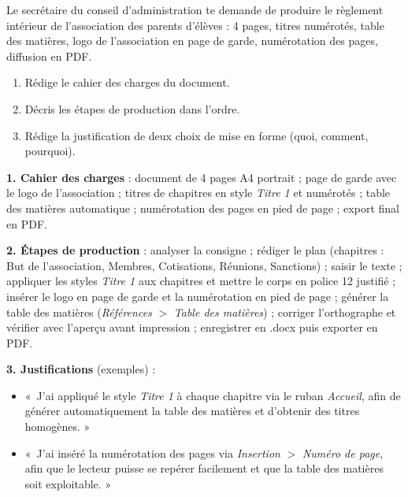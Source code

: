 \documentclass[11pt]{article}
\begin{document}
\begin{exercice}
Le secrétaire du conseil d'administration te demande de produire le règlement intérieur de l'association des parents d'élèves : 4 pages, titres numérotés, table des matières, logo de l'association en page de garde, numérotation des pages, diffusion en PDF.
\begin{enumerate}
\item Rédige le cahier des charges du document.
\item Décris les étapes de production dans l'ordre.
\item Rédige la justification de deux choix de mise en forme (quoi, comment, pourquoi).
\end{enumerate}
\end{exercice}

\begin{corrige}
\textbf{1. Cahier des charges} : document de 4 pages A4 portrait ; page de garde avec le logo de l'association ; titres de chapitres en style \emph{Titre 1} et numérotés ; table des matières automatique ; numérotation des pages en pied de page ; export final en PDF.

\textbf{2. Étapes de production} : analyser la consigne ; rédiger le plan (chapitres : But de l'association, Membres, Cotisations, Réunions, Sanctions) ; saisir le texte ; appliquer les styles \emph{Titre 1} aux chapitres et mettre le corps en police 12 justifié ; insérer le logo en page de garde et la numérotation en pied de page ; générer la table des matières (\emph{Références} $>$ \emph{Table des matières}) ; corriger l'orthographe et vérifier avec l'aperçu avant impression ; enregistrer en .docx puis exporter en PDF.

\textbf{3. Justifications} (exemples) :
\begin{itemize}
\item «\ J'ai appliqué le style \emph{Titre 1} à chaque chapitre via le ruban \emph{Accueil}, afin de générer automatiquement la table des matières et d'obtenir des titres homogènes. »
\item «\ J'ai inséré la numérotation des pages via \emph{Insertion} $>$ \emph{Numéro de page}, afin que le lecteur puisse se repérer facilement et que la table des matières soit exploitable. »
\end{itemize}
\end{corrige}
\end{document}
